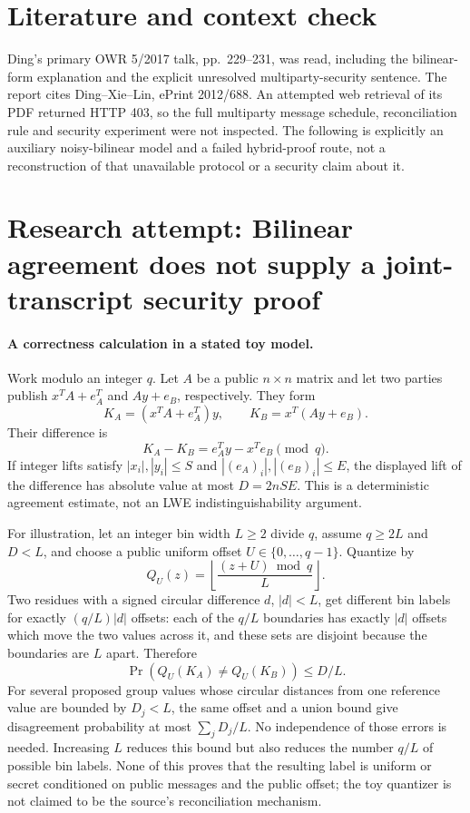 \documentclass[11pt]{article}
\begin{document}
\section{Literature and context check}
Ding's primary OWR 5/2017 talk, pp.~229--231, was read, including the bilinear-form explanation and the explicit unresolved multiparty-security sentence. The report cites Ding--Xie--Lin, ePrint 2012/688. An attempted web retrieval of its PDF returned HTTP 403, so the full multiparty message schedule, reconciliation rule and security experiment were not inspected. The following is explicitly an auxiliary noisy-bilinear model and a failed hybrid-proof route, not a reconstruction of that unavailable protocol or a security claim about it.
\section{Research attempt: Bilinear agreement does not supply a joint-transcript security proof}

\paragraph{A correctness calculation in a stated toy model.}
Work modulo an integer $q$. Let $A$ be a public $n\times n$ matrix and let two parties publish $x^TA+e_A^T$ and $Ay+e_B$, respectively. They form
\[
 K_A=(x^TA+e_A^T)y,\qquad K_B=x^T(Ay+e_B).
\]
Their difference is
\[
 K_A-K_B=e_A^Ty-x^Te_B\pmod q.
\]
If integer lifts satisfy $|x_i|,|y_i|\le S$ and $|(e_A)_i|,|(e_B)_i|\le E$, the displayed lift of the difference has absolute value at most $D=2nSE$. This is a deterministic agreement estimate, not an LWE indistinguishability argument.

For illustration, let an integer bin width $L\ge2$ divide $q$, assume $q\ge2L$ and $D<L$, and choose a public uniform offset $U\in\{0,\ldots,q-1\}$. Quantize by
\[
 Q_U(z)=\left\lfloor\frac{(z+U)\bmod q}{L}\right\rfloor.
\]
Two residues with a signed circular difference $d$, $|d|<L$, get different bin labels for exactly $(q/L)|d|$ offsets: each of the $q/L$ boundaries has exactly $|d|$ offsets which move the two values across it, and these sets are disjoint because the boundaries are $L$ apart. Therefore
\[
 \Pr(Q_U(K_A)\ne Q_U(K_B))\le D/L.
\]
For several proposed group values whose circular distances from one reference value are bounded by $D_j<L$, the same offset and a union bound give disagreement probability at most $\sum_jD_j/L$. No independence of those errors is needed. Increasing $L$ reduces this bound but also reduces the number $q/L$ of possible bin labels. None of this proves that the resulting label is uniform or secret conditioned on public messages and the public offset; the toy quantizer is not claimed to be the source's reconciliation mechanism.
\end{document}
